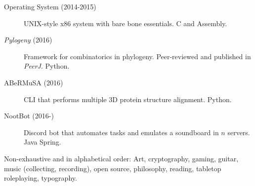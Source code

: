 \documentclass[10pt,a4paper]{article}
\begin{document}
\spacedhrule{1.6em}{-0.4em} %



\begin{description}
\item [Operating System (2014-2015)] UNIX-style x86 system with bare bone essentials. C and Assembly.
\item [\textit{Pylogeny} (2016)] Framework for combinatorics in phylogeny. Peer-reviewed and published in \textit{PeerJ}. Python.
\item [ABeRMuSA (2016)] CLI that performs multiple 3D protein structure alignment. Python.
\item [NootBot (2016-)] Discord bot that automates tasks and emulates a soundboard in $n$ servers. Java Spring.
\end{description}


\spacedhrule{1.6em}{-0.4em} %



\inlineheadsection %
{Non-exhaustive and in alphabetical order:}
{Art, cryptography, gaming, guitar, music (collecting, recording), open source, philosophy, reading, tabletop roleplaying, typography.}
\end{document}
